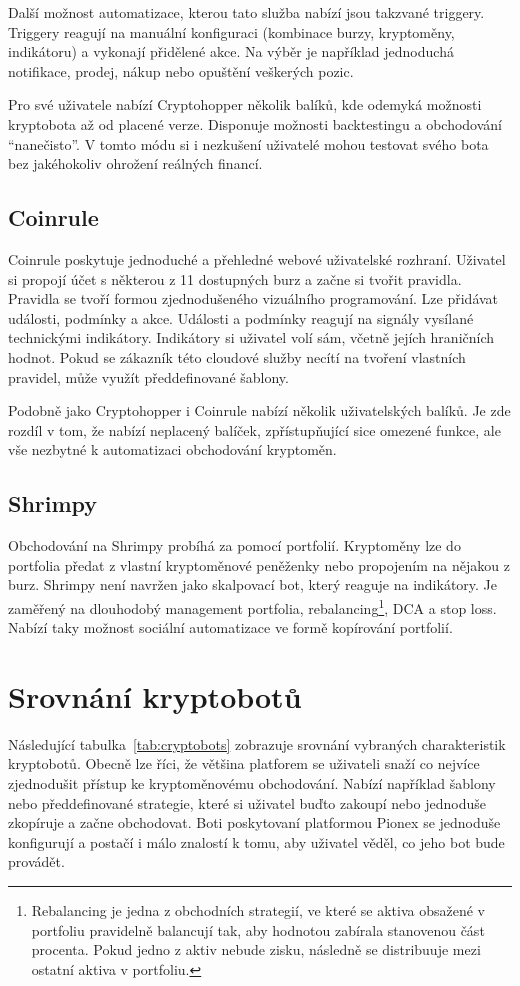 Další možnost automatizace, kterou tato služba nabízí jsou takzvané triggery. Triggery reagují na manuální konfiguraci (kombinace burzy, kryptoměny, indikátoru) a vykonají
přidělené akce. Na výběr je například jednoduchá notifikace, prodej, nákup nebo opuštění veškerých pozic.

Pro své uživatele nabízí Cryptohopper několik balíků, kde odemyká možnosti kryptobota až od placené verze. Disponuje možnosti backtestingu a obchodování \enquote{nanečisto}.
V tomto módu si i nezkušení uživatelé mohou testovat svého bota bez jakéhokoliv ohrožení reálných financí.

\subsection{Coinrule}
Coinrule poskytuje jednoduché a přehledné webové uživatelské rozhraní. Uživatel si propojí účet s některou z 11 dostupných burz a začne si tvořit pravidla. Pravidla se tvoří
formou zjednodušeného vizuálního programování. Lze přidávat události, podmínky a akce. Události a podmínky reagují na signály vysílané technickými indikátory. Indikátory
si uživatel volí sám, včetně jejích hraničních hodnot. Pokud se zákazník této cloudové služby necítí na tvoření vlastních pravidel, může využít předdefinované šablony.

Podobně jako Cryptohopper i Coinrule nabízí několik uživatelských balíků. Je zde rozdíl v tom, že nabízí neplacený balíček, zpřístupňující sice omezené funkce, ale
vše nezbytné k automatizaci obchodování kryptoměn.


\subsection{Shrimpy}
Obchodování na Shrimpy probíhá za pomocí portfolií. Kryptoměny lze do portfolia předat z vlastní kryptoměnové peněženky nebo propojením na nějakou z burz. Shrimpy není navržen jako
skalpovací bot, který reaguje na indikátory. Je zaměřený na dlouhodobý management portfolia, rebalancing\footnote{Rebalancing je jedna z obchodních strategií, ve které
    se aktiva obsažené v portfoliu pravidelně balancují tak, aby hodnotou zabírala stanovenou část procenta. Pokud jedno z aktiv nebude zisku, následně se distribuuje mezi ostatní
    aktiva v portfoliu.},
DCA a stop loss. Nabízí taky možnost sociální automatizace ve formě kopírování portfolií.


\section{Srovnání kryptobotů}
Následující tabulka~\ref{tab:cryptobots} zobrazuje srovnání vybraných charakteristik kryptobotů. Obecně lze říci, že většina platforem se uživateli snaží
co nejvíce zjednodušit přístup ke kryptoměnovému obchodování. Nabízí například šablony nebo předdefinované strategie, které si uživatel buďto zakoupí nebo jednoduše zkopíruje
a začne obchodovat. Boti poskytovaní platformou Pionex se jednoduše konfigurují a postačí i málo znalostí k tomu, aby uživatel věděl, co jeho bot bude provádět.

